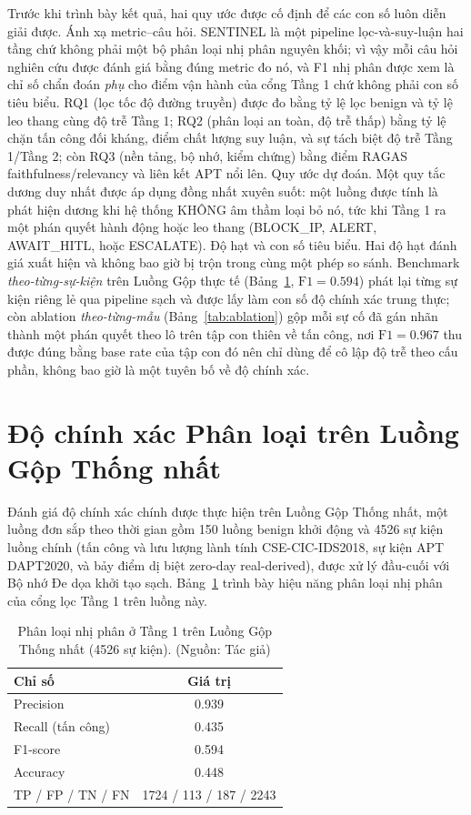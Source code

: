 Trước khi trình bày kết quả, hai quy ước được cố định để các con số luôn diễn giải được. Ánh xạ metric--câu hỏi. SENTINEL là một pipeline lọc-và-suy-luận hai tầng chứ không phải một bộ phân loại nhị phân nguyên khối; vì vậy mỗi câu hỏi nghiên cứu được đánh giá bằng đúng metric đo nó, và F1 nhị phân được xem là chỉ số chẩn đoán \emph{phụ} cho điểm vận hành của cổng Tầng 1 chứ không phải con số tiêu biểu. RQ1 (lọc tốc độ đường truyền) được đo bằng tỷ lệ lọc benign và tỷ lệ leo thang cùng độ trễ Tầng 1; RQ2 (phân loại an toàn, độ trễ thấp) bằng tỷ lệ chặn tấn công đối kháng, điểm chất lượng suy luận, và sự tách biệt độ trễ Tầng 1/Tầng 2; còn RQ3 (nền tảng, bộ nhớ, kiểm chứng) bằng điểm RAGAS faithfulness/relevancy và liên kết APT nổi lên. Quy ước dự đoán. Một quy tắc dương duy nhất được áp dụng đồng nhất xuyên suốt: một luồng được tính là phát hiện dương khi hệ thống KHÔNG âm thầm loại bỏ nó, tức khi Tầng 1 ra một phán quyết hành động hoặc leo thang (BLOCK\_IP, ALERT, AWAIT\_HITL, hoặc ESCALATE). Độ hạt và con số tiêu biểu. Hai độ hạt đánh giá xuất hiện và không bao giờ bị trộn trong cùng một phép so sánh. Benchmark \emph{theo-từng-sự-kiện} trên Luồng Gộp thực tế (Bảng~\ref{tab:classification}, $\mathrm{F1}=0.594$) phát lại từng sự kiện riêng lẻ qua pipeline sạch và được lấy làm con số độ chính xác trung thực; còn ablation \emph{theo-từng-mẫu} (Bảng~\ref{tab:ablation}) gộp mỗi sự cố đã gán nhãn thành một phán quyết theo lô trên tập con thiên về tấn công, nơi $\mathrm{F1}=0.967$ thu được đúng bằng base rate của tập con đó nên chỉ dùng để cô lập độ trễ theo cấu phần, không bao giờ là một tuyên bố về độ chính xác.

\section{Độ chính xác Phân loại trên Luồng Gộp Thống nhất}
Đánh giá độ chính xác chính được thực hiện trên Luồng Gộp Thống nhất, một luồng đơn sắp theo thời gian gồm 150 luồng benign khởi động và 4526 sự kiện luồng chính (tấn công và lưu lượng lành tính CSE-CIC-IDS2018, sự kiện APT DAPT2020, và bảy điểm dị biệt zero-day real-derived), được xử lý đầu-cuối với Bộ nhớ Đe dọa khởi tạo sạch. Bảng~\ref{tab:classification} trình bày hiệu năng phân loại nhị phân của cổng lọc Tầng 1 trên luồng này.

\begin{table}[!htbp]
    \centering
    \caption{Phân loại nhị phân ở Tầng 1 trên Luồng Gộp Thống nhất (4526 sự kiện). (Nguồn: Tác giả)}
    \label{tab:classification}
    \begin{tabular}{|l|c|}
        \hline
        \textbf{Chỉ số} & \textbf{Giá trị} \\
        \hline
        Precision & 0.939 \\
        \hline
        Recall (tấn công) & 0.435 \\
        \hline
        F1-score & 0.594 \\
        \hline
        Accuracy & 0.448 \\
        \hline
        TP / FP / TN / FN & 1724 / 113 / 187 / 2243 \\
        \hline
    \end{tabular}
\end{table}

